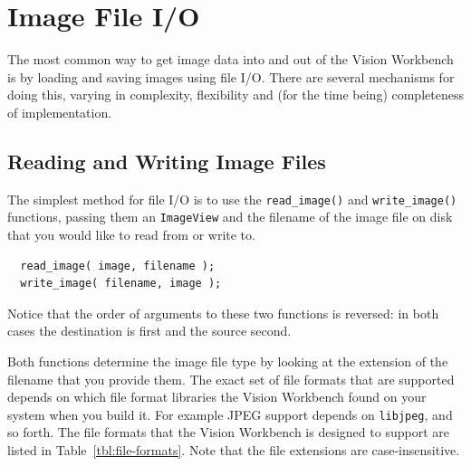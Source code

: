 \section{Image File I/O}

The most common way to get image data into and out of the Vision Workbench 
is by loading and saving images using file I/O.  There are several mechanisms 
for doing this, varying in complexity, flexibility and (for the time being) 
completeness of implementation.

\subsection{Reading and Writing Image Files}

The simplest method for file I/O is to use the \verb#read_image()# and 
\verb#write_image()# functions, passing them an \verb#ImageView# and 
the filename of the image file on disk that you would like to read from 
or write to.
\begin{verbatim}
  read_image( image, filename );
  write_image( filename, image );
\end{verbatim}
Notice that the order of arguments to these two functions is reversed: 
in both cases the destination is first and the source second.

Both functions determine the image file type by looking at the 
extension of the filename that you provide them.  The exact set of 
file formats that are supported depends on which file format libraries 
the Vision Workbench found on your system when you build it.  For 
example JPEG support depends on \verb#libjpeg#, and so forth.  The 
file formats that the Vision Workbench is designed to support are 
listed in Table~\ref{tbl:file-formats}.  Note that the file extensions 
are case-insensitive.

